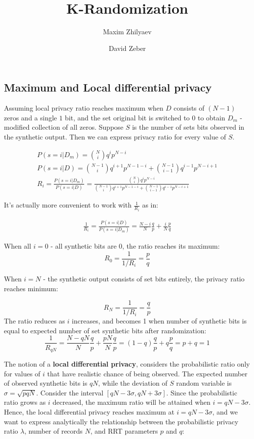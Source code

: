 \documentclass[11pt,draft]{article}
\title{K-Randomization}
\author{Maxim Zhilyaev \and David Zeber}
\begin{document}
\maketitle


\subsection{Maximum and Local differential privacy}

Assuming local privacy ratio reaches maximum when $D$ consists of $(N-1)$ zeros and a single $1$ bit, and the set original bit is switched to $0$ to obtain $D_m$ - modified collection of all zeros.
Suppose $S$ is the number of sets bits observed in the synthetic output.   Then we can express privacy ratio for every value of $S$.

\begin{align}
P(s=i | D_m ) = \binom{N}{i}q^ip^{N-i} \\
P(s=i | D ) = \binom{N-1}{i}q^{i+1}p^{N-1-i} +   \binom{N-1}{i-1}q^{i-1}p^{N-i+1}  \\
R_i = \frac{P(s=i | D_m)}{P(s=i | D)} = \frac{ \binom{N}{i}q^ip^{N-i} }{  \binom{N-1}{i}q^{i+1}p^{N-1-i} +   \binom{N-1}{i-1}q^{i-1}p^{N-i+1} }
\end{align}

It's actually more convenient to work with $\frac{1}{R_i}$ as in:

\begin{align}
\frac{1}{R_i} = \frac{P(s=i | D)}{P(s=i | D_m)} = \frac{N-i}{N}\frac{q}{p} + \frac{i}{N} \frac{p}{q}
\end{align}

When all $i=0$ - all synthetic bits are 0, the ratio reaches its maximum:
\[
R_0 = \frac{1}{1/R_i}= \frac{p}{q}
\]

When $i=N$ - the synthetic output consists of set bits entirely, the privacy ratio reaches minimum:

\[
R_N = \frac{1}{1/R_i}= \frac{q}{p}
\]
The ratio reduces as $i$ increases, and becomes 1 when number of synthetic bits is equal to expected number of set synthetic bits after randomization:
\[
\frac{1}{R_{qN}} = \frac{N-qN}{N}\frac{q}{p} + \frac{pN}{N} \frac{q}{p} =  (1-q)\frac{q}{p} + q \frac{p}{q} = p + q = 1
\]

The notion of a  \textbf{local differential privacy}, considers the probabilistic ratio only for values of $i$ that have realistic chance of being observed.  The expected number of observed synthetic bits is $qN$, while the deviation of $S$ random variable is $\sigma=\sqrt{pqN}$.  Consider the interval $[qN - 3\sigma,  qN +3\sigma]$. Since the probabilistic ratio grows as $i$ decreased, the maximum ratio will be attained when $i= qN - 3\sigma$.  Hence, the local differential privacy reaches maximum at $i= qN - 3\sigma$, and we want to express analytically the relationship between the probabilistic privacy ratio $\lambda$, number of records $N$, and RRT parameters $p$ and $q$:
\end{document}
